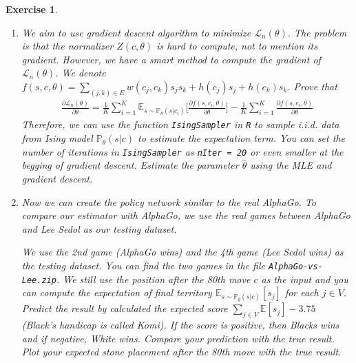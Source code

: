 \documentclass[12pt]{article}
\theoremstyle{colon}
\newtheorem{exercise}{Exercise}
\begin{document}
\begin{exercise}
\begin{enumerate}[label=\arabic*)]
    \item We aim to use gradient descent algorithm to minimize $\mathcal{L}_n(\theta)$. The problem is that the normalizer $Z(c, \theta)$ is hard to compute, not to mention its gradient. However, we have a smart method to compute the gradient of $\mathcal{L}_n(\theta)$. We denote $f(s,c,\theta) = \sum_{(j,k) \in E} w(c_j, c_k) s_j s_k + h(c_j) s_j + h(c_k) s_k$. Prove that
      \begin{gather*}
        \frac{\partial \mathcal{L}_n (\theta)}{\partial \theta} = \frac{1}{K} \sum_{i=1}^K \mathbb{E}_{s \sim \mathbb{P}_\theta(s | c_i)} \big[ \frac{\partial f(s, c_i, \theta)}{\partial \theta} \big] - \frac{1}{K} \sum_{i=1}^K \frac{\partial f(s, c_i, \theta)}{\partial \theta}
      \end{gather*}
      Therefore, we can use the function \texttt{IsingSampler} in \texttt{R} to sample i.i.d. data from Ising model $\mathbb{P}_\theta(s|c)$ to estimate the expectation term. You can set the number of iterations in \texttt{IsingSampler} as \texttt{nIter = 20} or even smaller at the begging of gradient descent. Estimate the parameter $\hat{\theta}$ using the MLE and gradient descent.

    \item Now we can create the policy network similar to the real AlphaGo. To compare our estimator with AlphaGo, we use the real games between AlphaGo and Lee Sedol as our testing dataset.

      We use the 2nd game (AlphaGo wins) and the 4th game (Lee Sedol wins) as the testing dataset. You can find the two games in the file \texttt{AlphaGo-vs-Lee.zip}. We still use the position after the 80th move $c$ as the input and you can compute the expectation of final territory $\mathbb{E}_{s \sim \mathbb{P}_{\hat{\theta}}(s | c)} [ s_j ]$ for each $j \in V$. Predict the result by calculated the expected score $\sum_{j \in V} \mathbb{E}[s_j] - 3.75$ (Black's handicap is called Komi). If the score is positive, then Blacks wins and if negative, White wins. Compare your prediction with the true result. Plot your expected stone placement after the 80th move with the true result.
  \end{enumerate}
\end{exercise}
\end{document}
